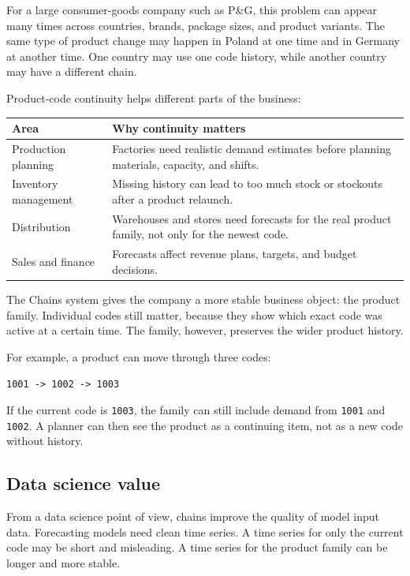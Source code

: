 \documentclass[12pt]{article}
\begin{document}
For a large consumer-goods company such as P\&G, this problem can appear many times across countries, brands, package sizes, and product variants. The same type of product change may happen in Poland at one time and in Germany at another time. One country may use one code history, while another country may have a different chain.

Product-code continuity helps different parts of the business:

\begin{longtable}{|p{}|p{}|}
\hline
\textbf{Area} & \textbf{Why continuity matters} \\
\hline
Production planning & Factories need realistic demand estimates before planning materials, capacity, and shifts. \\
\hline
Inventory management & Missing history can lead to too much stock or stockouts after a product relaunch. \\
\hline
Distribution & Warehouses and stores need forecasts for the real product family, not only for the newest code. \\
\hline
Sales and finance & Forecasts affect revenue plans, targets, and budget decisions. \\
\hline
\end{longtable}

The Chains system gives the company a more stable business object: the product family. Individual codes still matter, because they show which exact code was active at a certain time. The family, however, preserves the wider product history.

For example, a product can move through three codes:

\begin{center}
\texttt{1001 -> 1002 -> 1003}
\end{center}

If the current code is \texttt{1003}, the family can still include demand from \texttt{1001} and \texttt{1002}. A planner can then see the product as a continuing item, not as a new code without history.

\subsection{Data science value}

From a data science point of view, chains improve the quality of model input data. Forecasting models need clean time series. A time series for only the current code may be short and misleading. A time series for the product family can be longer and more stable.
\end{document}
